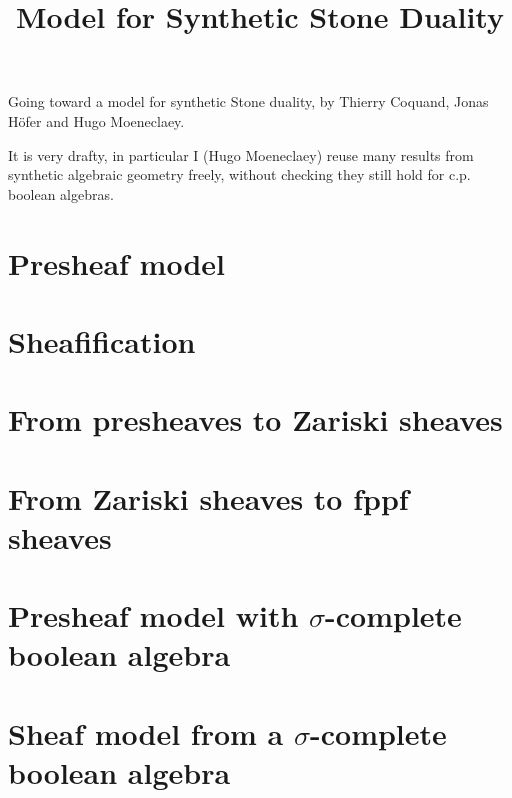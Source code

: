 \documentclass{../util/zariski}
\title{Model for Synthetic Stone Duality}
\begin{document}
\maketitle

Going toward a model for synthetic Stone duality, by Thierry Coquand, Jonas Höfer and Hugo Moeneclaey.

It is very drafty, in particular I (Hugo Moeneclaey) reuse many results from synthetic algebraic geometry freely, without checking they still hold for c.p. boolean algebras.


\tableofcontents

\section{Presheaf model}


\section{Sheafification}


\section{From presheaves to Zariski sheaves}


\section{From Zariski sheaves to fppf sheaves}


\section{Presheaf model with $\sigma$-complete boolean algebra}


\section{Sheaf model from a $\sigma$-complete boolean algebra}




\printindex

\printbibliography
\end{document}
